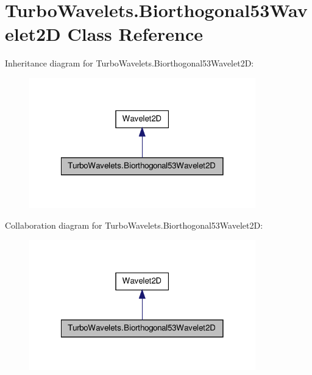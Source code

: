 \hypertarget{class_turbo_wavelets_1_1_biorthogonal53_wavelet2_d}{\section{\-Turbo\-Wavelets.\-Biorthogonal53\-Wavelet2\-D \-Class \-Reference}
\label{class_turbo_wavelets_1_1_biorthogonal53_wavelet2_d}
}


\-Inheritance diagram for \-Turbo\-Wavelets.\-Biorthogonal53\-Wavelet2\-D\-:
\nopagebreak
\begin{figure}[H]
\begin{center}
\leavevmode
\includegraphics[width=278pt]{class_turbo_wavelets_1_1_biorthogonal53_wavelet2_d__inherit__graph}
\end{center}
\end{figure}


\-Collaboration diagram for \-Turbo\-Wavelets.\-Biorthogonal53\-Wavelet2\-D\-:
\nopagebreak
\begin{figure}[H]
\begin{center}
\leavevmode
\includegraphics[width=278pt]{class_turbo_wavelets_1_1_biorthogonal53_wavelet2_d__coll__graph}
\end{center}
\end{figure}
